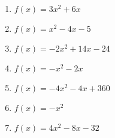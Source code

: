 \documentclass{article}%
\begin{document}
\begin{enumerate}[label=\alph*)]
\item%
\newline\vspace{0.5cm} $f(x)=3x^2 + 6x$%
\item%
\newline\vspace{0.5cm} $f(x)=x^2 - 4x - 5$%
\item%
\newline\vspace{0.5cm} $f(x)=-2x^2 + 14x - 24$%
\item%
\newline\vspace{0.5cm} $f(x)=-x^2 - 2x$%
\item%
\newline\vspace{0.5cm} $f(x)=-4x^2 - 4x + 360$%
\item%
\newline\vspace{0.5cm} $f(x)=-x^2$%
\item%
\newline\vspace{0.5cm} $f(x)=4x^2 - 8x - 32$%
\end{enumerate}

%
\end{document}
